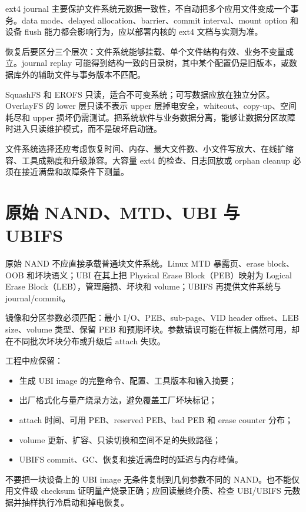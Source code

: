 ext4 journal 主要保护文件系统元数据一致性，不自动把多个应用文件变成一个事务。data mode、delayed allocation、barrier、commit interval、mount option 和设备 flush 能力都会影响行为，应以部署内核的 ext4 文档与实测为准\cite{linux-ext4-doc}。

恢复后要区分三个层次：文件系统能够挂载、单个文件结构有效、业务不变量成立。journal replay 可能得到结构一致的目录树，其中某个配置仍是旧版本，或数据库外的辅助文件与事务版本不匹配。

SquashFS 和 EROFS 只读，适合不可变系统；可写数据应放在独立分区。OverlayFS 的 lower 层只读不表示 upper 层掉电安全，whiteout、copy-up、空间耗尽和 upper 损坏仍需测试。把系统软件与业务数据分离，能够让数据分区故障时进入只读维护模式，而不是破坏启动链。

文件系统选择还应考虑恢复时间、内存、最大文件数、小文件写放大、在线扩缩容、工具成熟度和升级兼容。大容量 ext4 的检查、日志回放或 orphan cleanup 必须在接近满盘和故障条件下测量。

\section{原始 NAND、MTD、UBI 与 UBIFS}

原始 NAND 不应直接承载普通块文件系统。Linux MTD 暴露页、erase block、OOB 和坏块语义；UBI 在其上把 Physical Erase Block（PEB）映射为 Logical Erase Block（LEB），管理磨损、坏块和 volume；UBIFS 再提供文件系统与 journal/commit\cite{linux-ubi-doc,linux-ubifs-doc}。

镜像和分区参数必须匹配：最小 I/O、PEB、sub-page、VID header offset、LEB size、volume 类型、保留 PEB 和预期坏块。参数错误可能在样板上偶然可用，却在不同批次坏块分布或升级后 attach 失败。

工程中应保留：

\begin{itemize}
  \item 生成 UBI image 的完整命令、配置、工具版本和输入摘要；
  \item 出厂格式化与量产烧录方法，避免覆盖工厂坏块标记；
  \item attach 时间、可用 PEB、reserved PEB、bad PEB 和 erase counter 分布；
  \item volume 更新、扩容、只读切换和空间不足的失败路径；
  \item UBIFS commit、GC、恢复和接近满盘时的延迟与内存峰值。
\end{itemize}

不要把一块设备上的 UBI image 无条件复制到几何参数不同的 NAND。也不能仅用文件级 checksum 证明量产烧录正确；应回读最终介质、检查 UBI/UBIFS 元数据并抽样执行冷启动和掉电恢复。

